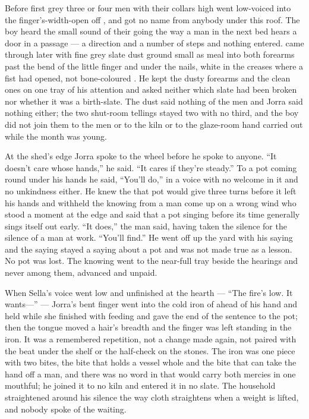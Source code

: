 \scenebreak

Before first grey three or four men with their collars high went low-voiced into the finger's-width-open  off , and got no name from anybody under this roof. The boy heard the small sound of their going the way a man in the next bed hears a door in a passage --- a direction and a number of steps and nothing entered.  came through later with fine grey slate dust ground small as meal into both forearms past the bend of the little finger and under the nails, white in the creases where a fist had opened, not bone-coloured . He kept the dusty forearms and the clean ones on one tray of his attention and asked neither which slate had been broken nor whether it was a birth-slate. The dust said nothing of the men and Jorra said nothing either; the two shut-room tellings stayed two with no third, and the boy did not join them to the men or to the kiln or to the glaze-room hand carried out while the month was young.

At the shed's edge Jorra spoke to the wheel before he spoke to anyone. “It doesn't care whose hands,” he said. “It cares if they're steady.” To a pot coming round under his hands he said, “You'll do,” in a voice with no welcome in it and no unkindness either. He knew the  that pot would give three turns before it left his hands and withheld the knowing from a man come up on a wrong wind who stood a moment at the edge and said that a pot singing before its time generally sings itself out early. “It does,” the man said, having taken the silence for the silence of a man at work. “You'll find.” He went off up the yard with his saying and the saying stayed a saying about a pot and was not made true as a lesson. No pot was lost. The knowing went to the near-full tray beside the hearings and never among them, advanced and unpaid.

When Sella's voice went low and unfinished at the hearth --- “The fire's low. It wants---” --- Jorra's bent finger went into the cold iron of  ahead of his hand and held while she finished with feeding and gave the end of the sentence to the pot; then the tongue moved a hair's breadth and the finger was left standing in the iron. It was a remembered repetition, not a change made again, not paired with the beat under the shelf or the half-check on the stones. The iron was one piece with two bites, the bite that holds a vessel whole and the bite that can take the hand off a man, and there was no word in  that would carry both mercies in one mouthful; he joined it to no kiln and entered it in no slate. The household straightened around his silence the way cloth straightens when a weight is lifted, and nobody spoke of the waiting.

